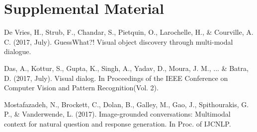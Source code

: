 \documentclass[11pt,a4paper]{article}
\begin{document}
\appendix


\section{Supplemental Material}
\label{sec:supplemental}
De Vries, H., Strub, F., Chandar, S., Pietquin, O., Larochelle, H., & Courville, A. C. (2017, July). GuessWhat?! Visual object discovery through multi-modal dialogue. 


Das, A., Kottur, S., Gupta, K., Singh, A., Yadav, D., Moura, J. M., ... & Batra, D. (2017, July). Visual dialog. In Proceedings of the IEEE Conference on Computer Vision and Pattern Recognition(Vol. 2).


Mostafazadeh, N., Brockett, C., Dolan, B., Galley, M., Gao, J., Spithourakis, G. P., & Vanderwende, L. (2017). Image-grounded conversations: Multimodal context for natural question and response generation. In Proc. of IJCNLP.
\end{document}
